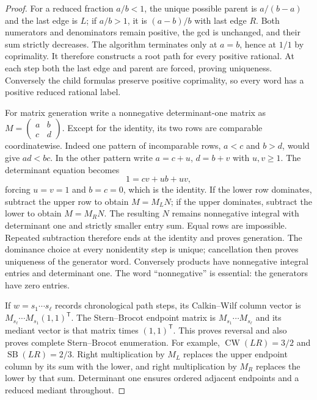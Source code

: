 \begin{proof}
For a reduced fraction $a/b<1$, the unique possible parent is
$a/(b-a)$ and the last edge is $L$; if $a/b>1$, it is $(a-b)/b$ with
last edge $R$.  Both numerators and denominators remain positive,
the gcd is unchanged, and their sum strictly decreases.  The
algorithm terminates only at $a=b$, hence at $1/1$ by coprimality.
It therefore constructs a root path for every positive rational.
At each step both the last edge and parent are forced, proving
uniqueness.  Conversely the child formulas preserve positive
coprimality, so every word has a positive reduced rational label.

For matrix generation write a nonnegative determinant-one matrix as
$M=\left(\begin{smallmatrix}a&b\\c&d\end{smallmatrix}\right)$.
Except for the identity, its two rows are comparable coordinatewise.
Indeed one pattern of incomparable rows, $a<c$ and $b>d$, would
give $ad<bc$.  In the other pattern write $a=c+u$, $d=b+v$ with
$u,v\geq1$.  The determinant equation becomes
\[
 1=cv+ub+uv,
\]
forcing $u=v=1$ and $b=c=0$, which is the identity.  If the lower
row dominates, subtract the upper row to obtain $M=M_LN$; if the
upper dominates, subtract the lower to obtain $M=M_RN$.
The resulting $N$ remains nonnegative integral with determinant one
and strictly smaller entry sum.  Equal rows are impossible.  Repeated
subtraction therefore ends at the identity and proves generation.
The dominance choice at every nonidentity step is unique; cancellation
then proves uniqueness of the generator word.  Conversely products
have nonnegative integral entries and determinant one.  The word
``nonnegative'' is essential: the generators have zero entries.

If $w=s_1\cdots s_\ell$ records chronological path steps, its
Calkin--Wilf column vector is
$M_{s_\ell}\cdots M_{s_1}(1,1)^{\mathsf T}$.  The Stern--Brocot
endpoint matrix is $M_{s_1}\cdots M_{s_\ell}$ and its mediant vector
is that matrix times $(1,1)^{\mathsf T}$.  This proves reversal and
also proves complete Stern--Brocot enumeration.  For example,
$\operatorname{CW}(LR)=3/2$ and $\operatorname{SB}(LR)=2/3$.
Right multiplication by $M_L$ replaces the upper endpoint column
by its sum with the lower, and right multiplication by $M_R$ replaces
the lower by that sum.  Determinant one ensures ordered adjacent
endpoints and a reduced mediant throughout.


\end{proof}
